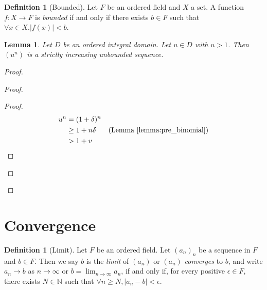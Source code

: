 \documentclass{article}
\let\qed\relax
\newtheorem{lemma}[axiom]{Lemma}
\theoremstyle{definition}
\newtheorem{definition}[axiom]{Definition}
\begin{document}
    \begin{definition}[Bounded]
        Let $F$ be an ordered field and $X$ a set. A function $f : X \rightarrow F$ is \emph{bounded} if and
        only if there exists $b \in F$ such that $\forall x \in X. |f(x)| < b$.
    \end{definition}

    \begin{lemma}
        \label{lemma:un_increasing_unbounded}
        Let $D$ be an ordered integral domain. Let $u \in D$ with $u > 1$. Then $(u^n)$ is a strictly increasing unbounded sequence.
    \end{lemma}

    \begin{proof}
        \pf
        \begin{proof}
            \begin{proof}
                \pf
                \begin{align*}
                    u^n & = (1 + \delta)^n \\
                    & \geq 1 + n \delta & (\text{Lemma \ref{lemma:pre_binomial}}) \\
                    & > 1 + v
                \end{align*}
            \end{proof}
        \end{proof}
        \qed
    \end{proof}

    \section{Convergence}

    \begin{definition}[Limit]
        Let $F$ be an ordered field. Let $(a_n)_n$ be a sequence in $F$ and $b \in F$. Then we say $b$ is the
        \emph{limit} of $(a_n)$ or $(a_n)$ \emph{converges} to $b$, and write $a_n \rightarrow b$ as
        $n \rightarrow \infty$ or 
        $b = \lim_{n \rightarrow \infty} a_n$, if and only if,
        for every positive $\epsilon \in F$, there exists $N \in \mathbb{N}$ such that
        $\forall n \geq N, |a_n - b| < \epsilon$.
    \end{definition}
\end{document}
